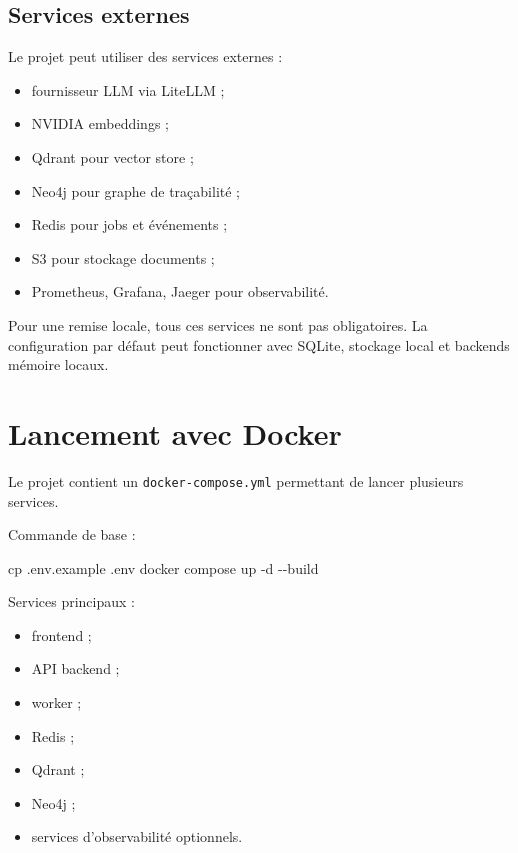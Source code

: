 \documentclass[
  french,
]{report}
\newenvironment{Shaded}{}{}
\newcommand{\AttributeTok}[1]{\textcolor[rgb]{0.49,0.56,0.16}{#1}}
\newcommand{\ExtensionTok}[1]{#1}
\newcommand{\FunctionTok}[1]{\textcolor[rgb]{0.02,0.16,0.49}{#1}}
\newcommand{\NormalTok}[1]{#1}
\providecommand{\tightlist}{%
  \setlength{\itemsep}{0pt}\setlength{\parskip}{0pt}}
\begin{document}
\section{Services externes}\label{services-externes}

Le projet peut utiliser des services externes :

\begin{itemize}
\tightlist
\item
  fournisseur LLM via LiteLLM ;
\item
  NVIDIA embeddings ;
\item
  Qdrant pour vector store ;
\item
  Neo4j pour graphe de traçabilité ;
\item
  Redis pour jobs et événements ;
\item
  S3 pour stockage documents ;
\item
  Prometheus, Grafana, Jaeger pour observabilité.
\end{itemize}

Pour une remise locale, tous ces services ne sont pas obligatoires. La
configuration par défaut peut fonctionner avec SQLite, stockage local et
backends mémoire locaux.

\chapter{Lancement avec Docker}\label{lancement-avec-docker}

Le projet contient un \texttt{docker-compose.yml} permettant de lancer
plusieurs services.

Commande de base :

\begin{Shaded}
\begin{Highlighting}[]
\FunctionTok{cp}\NormalTok{ .env.example .env}
\ExtensionTok{docker}\NormalTok{ compose up }\AttributeTok{{-}d} \AttributeTok{{-}{-}build}
\end{Highlighting}
\end{Shaded}

Services principaux :

\begin{itemize}
\tightlist
\item
  frontend ;
\item
  API backend ;
\item
  worker ;
\item
  Redis ;
\item
  Qdrant ;
\item
  Neo4j ;
\item
  services d'observabilité optionnels.
\end{itemize}
\end{document}
